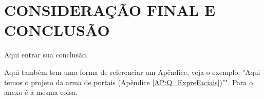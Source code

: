 \chapter{\bfseries  CONSIDERAÇÃO FINAL E CONCLUSÃO}
\label{Conclusao}

Aqui entrar sua conclusão.

Aqui também tem uma forma de referenciar um Apêndice, veja o exemplo: "Aqui temos o projeto da arma de portais (Apêndice \ref{AP:Q_ExpreFaciais})"". Para o anexo é a mesma coisa.